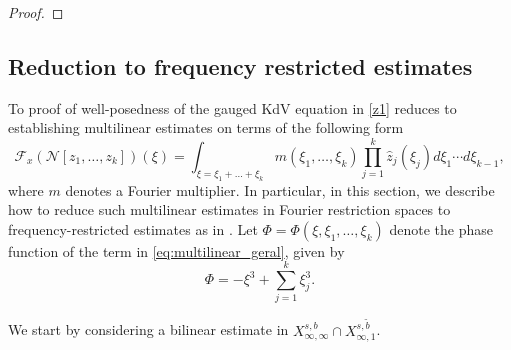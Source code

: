 \documentclass[%
11pt,  reqno]{amsart}
\newcommand{\5}{\textup{V}}
\newcommand{\noi}{\noindent}
\newcommand{\ft}{\widehat}
\newcommand{\les}{\lesssim}
\newcommand{\wt}{\widetilde}
\newcommand{\dx}{\partial_x}
\theoremstyle{remark}
\newcommand{\Ft}{{\mathcal{F}}}
\numberwithin{equation}{section}
\numberwithin{theorem}{section}
\begin{document}
\begin{proof}
			
		\end{proof}
		
		
		
	
	
	
	\subsection{Reduction to frequency restricted estimates}\label{sec:fre}
	
	

	To proof of well-posedness of the gauged KdV equation in \eqref{z1} reduces to establishing multilinear estimates on terms of the following form
		\begin{equation}\label{eq:multilinear_geral}
			\Ft_x (\mathcal{N}[z_1,\dots, z_k])(\xi)=\int_{\xi=\xi_1+\dots+\xi_k} m(\xi_1,\dots,\xi_k)\prod_{j=1}^k\ft{z}_j(\xi_j) d\xi_1\cdots d\xi_{k-1}, 
		\end{equation}
where $m$ denotes a Fourier multiplier. 
In particular, in this section, we describe how to reduce such multilinear estimates in Fourier restriction spaces to frequency-restricted estimates as in \cite{CLS}. Let  $\Phi = \Phi(\xi, \xi_1, \ldots, \xi_k)$ denote the phase function of the term in \eqref{eq:multilinear_geral}, given by
\begin{equation}\label{Phi}
 \Phi=-\xi^3+\sum_{j=1}^k\xi_j^3.
\end{equation}
        


\noi
We start by considering a bilinear estimate in $X^{s,b}_{\infty, \infty} \cap X^{s, \wt b}_{\infty, 1}$. 
\end{document}
